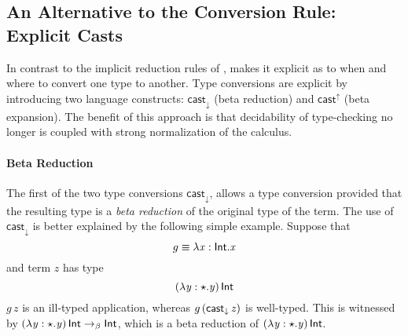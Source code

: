 \subsection{An Alternative to the Conversion Rule: Explicit Casts}

  In contrast to the implicit
reduction rules of \coc, \name makes it explicit as to when and where
to convert one type to another. Type conversions are explicit by
introducing two language constructs: $ \mathsf{cast}_{\downarrow} $ (beta reduction)
and $ \mathsf{cast}^{\uparrow} $ (beta expansion). The benefit of this approach is
that decidability of type-checking no longer is coupled with strong
normalization of the calculus.

\paragraph{Beta Reduction} The first of the two type conversions
$ \mathsf{cast}_{\downarrow} $, allows a type conversion provided that the resulting
type is a \emph{beta reduction} of the original type of the term. The
use of $ \mathsf{cast}_{\downarrow} $ is better explained by the following simple
example. Suppose that
\[ g \equiv \lambda  \mathit{x}  :  \mathsf{Int}  .  \mathit{x} \]
and term $z$ has type
\[ (  \lambda  \mathit{y}  :  \star  .  \mathit{y}  ) \, \mathsf{Int} \]
$ g\,z $ is an ill-typed application, whereas $ g\,(\mathsf{cast}_{\downarrow} \, \mathit{z}) $
is well-typed. This is witnessed by
$(  \lambda  \mathit{y}  :  \star  .  \mathit{y}  ) \, \mathsf{Int} \rightarrow_{\beta}  \mathsf{Int} $, which is a beta
reduction of $(  \lambda  \mathit{y}  :  \star  .  \mathit{y}  ) \, \mathsf{Int}$.  


